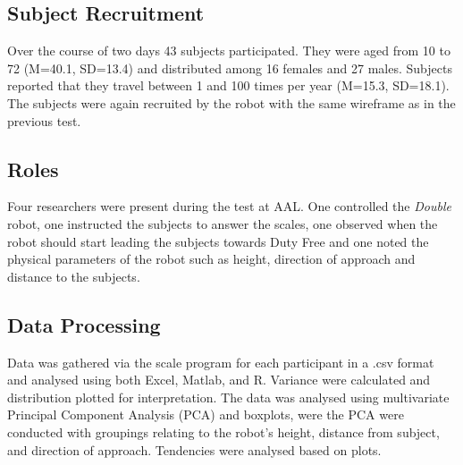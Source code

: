 \subsection{Subject Recruitment}
Over the course of two days 43 subjects participated. They were aged from 10 to 72 (M=40.1, SD=13.4) and distributed among 16 females and 27 males. Subjects reported that they travel between 1 and 100 times per year (M=15.3, SD=18.1). The subjects were again recruited by the robot with the same wireframe as in the previous test.

\subsection{Roles}
Four researchers were present during the test at AAL. One controlled the \textit{Double} robot, one instructed the subjects to answer the scales, one observed when the robot should start leading the subjects towards Duty Free and one noted the physical parameters of the robot such as height, direction of approach and distance to the subjects.

\subsection{Data Processing}
Data was gathered via the scale program for each participant in a .csv format and analysed using both Excel, Matlab, and R. Variance were calculated and distribution plotted for interpretation.
The data was analysed using multivariate Principal Component Analysis (PCA) and boxplots, were the PCA were conducted with groupings relating to the robot’s height, distance from subject,
and direction of approach. Tendencies were analysed based on plots. 